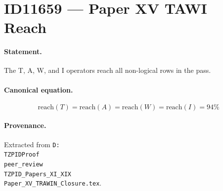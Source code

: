 \section*{ID11659 --- Paper XV TAWI Reach}

\paragraph{Statement.}
The T, A, W, and I operators reach all non-logical rows in the pass.

\paragraph{Canonical equation.}
\[
\mathrm{reach}(T)=\mathrm{reach}(A)=\mathrm{reach}(W)=\mathrm{reach}(I)=94\%
\]

\paragraph{Provenance.}
Extracted from \texttt{D:\\TZPIDProof\\peer\_review\\TZPID\_Papers\_XI\_XIX\\Paper\_XV\_TRAWIN\_Closure.tex}.
